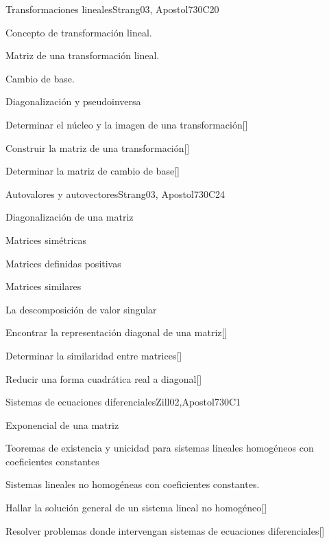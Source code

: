 \begin{syllabus}
\begin{unit}{Transformaciones lineales}{}{Strang03, Apostol73}{0}{C20}
\begin{topics}
      \item Concepto de transformación lineal.
      \item Matriz de una transformación lineal.
      \item Cambio de base.
      \item Diagonalización y pseudoinversa
   \end{topics}
   \begin{learningoutcomes}
      \item Determinar el núcleo y la imagen de una transformación[\Usage]
      \item Construir la matriz de una transformación[\Usage]
      \item Determinar la matriz de cambio de base[\Usage]
      \end{learningoutcomes}
\end{unit}

\begin{unit}{Autovalores y autovectores}{}{Strang03, Apostol73}{0}{C24}
\begin{topics}
      \item Diagonalización de una matriz
      \item Matrices simétricas
      \item Matrices definidas positivas
      \item Matrices similares
      \item La descomposición de valor singular
  \end{topics}
 \begin{learningoutcomes}
      \item Encontrar la representación diagonal de una matriz[\Usage]
      \item Determinar la similaridad entre matrices[\Usage]
      \item Reducir una forma cuadrática real a diagonal[\Usage]
   \end{learningoutcomes}
\end{unit}

\begin{unit}{Sistemas de ecuaciones diferenciales}{}{Zill02,Apostol73}{0}{C1}
\begin{topics}
      \item Exponencial de una matriz
      \item Teoremas de existencia y unicidad para sistemas lineales homogéneos con coeficientes constantes
      \item Sistemas lineales no homogéneas con coeficientes constantes.
   \end{topics}
\begin{learningoutcomes}
      \item Hallar la solución general de un sistema lineal no  homogéneo[\Usage]
      \item Resolver problemas donde intervengan sistemas de ecuaciones diferenciales[\Usage]
   \end{learningoutcomes}
\end{unit}


\end{syllabus}
